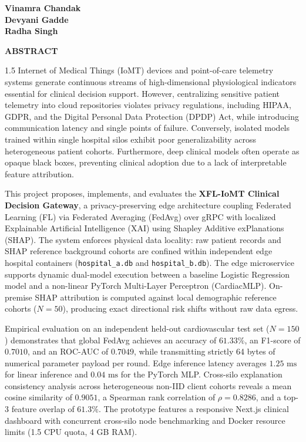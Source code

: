 \documentclass[12pt,a4paper,oneside]{report}
\begin{document}
\vspace{3.5em}
\noindent
\textbf{Vinamra Chandak}\\
\textbf{Devyani Gadde}\\
\textbf{Radha Singh}

\clearpage
\begin{center}
{\fontsize{14pt}{18pt}\bfseries\selectfont ABSTRACT}\\[1.5em]
\end{center}

\begin{spacing}{1.5}
Internet of Medical Things (IoMT) devices and point-of-care telemetry systems generate continuous streams of high-dimensional physiological indicators essential for clinical decision support. However, centralizing sensitive patient telemetry into cloud repositories violates privacy regulations, including HIPAA, GDPR, and the Digital Personal Data Protection (DPDP) Act, while introducing communication latency and single points of failure. Conversely, isolated models trained within single hospital silos exhibit poor generalizability across heterogeneous patient cohorts. Furthermore, deep clinical models often operate as opaque black boxes, preventing clinical adoption due to a lack of interpretable feature attribution.

This project proposes, implements, and evaluates the \textbf{XFL-IoMT Clinical Decision Gateway}, a privacy-preserving edge architecture coupling Federated Learning (FL) via Federated Averaging (FedAvg) over gRPC with localized Explainable Artificial Intelligence (XAI) using Shapley Additive exPlanations (SHAP). The system enforces physical data locality: raw patient records and SHAP reference background cohorts are confined within independent edge hospital containers (\texttt{hospital\_a.db} and \texttt{hospital\_b.db}). The edge microservice supports dynamic dual-model execution between a baseline Logistic Regression model and a non-linear PyTorch Multi-Layer Perceptron (CardiacMLP). On-premise SHAP attribution is computed against local demographic reference cohorts ($N=50$), producing exact directional risk shifts without raw data egress.

Empirical evaluation on an independent held-out cardiovascular test set ($N=150$) demonstrates that global FedAvg achieves an accuracy of $61.33\%$, an F1-score of $0.7010$, and an ROC-AUC of $0.7049$, while transmitting strictly 64 bytes of numerical parameter payload per round. Edge inference latency averages $1.25\text{ ms}$ for linear inference and $0.04\text{ ms}$ for the PyTorch MLP. Cross-silo explanation consistency analysis across heterogeneous non-IID client cohorts reveals a mean cosine similarity of $0.9051$, a Spearman rank correlation of $\rho = 0.8286$, and a top-3 feature overlap of $61.3\%$. The prototype features a responsive Next.js clinical dashboard with concurrent cross-silo node benchmarking and Docker resource limits (1.5 CPU quota, 4 GB RAM).
\end{spacing}
\end{document}
